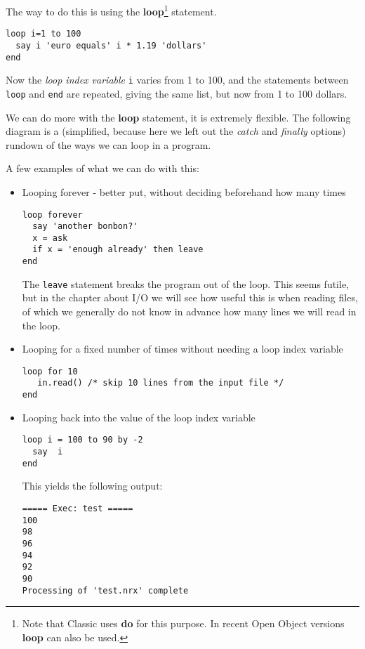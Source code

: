 {The way to do this is using the \textbf{loop}\footnote{Note that
  Classic \Rexx{} uses \textbf{do} for this purpose. In recent Open
  Object \Rexx{} versions
  \textbf{loop} can also be used.} statement.
\begin{lstlisting}[label=withoop,caption=With a loop]
loop i=1 to 100
  say i 'euro equals' i * 1.19 'dollars'
end
\end{lstlisting}
Now the \emph{loop index variable} \texttt{i} varies from 1 to 100,
and the statements between \texttt{loop} and \texttt{end} are
repeated, giving the same list, but now from 1 to 100 dollars.

We can do more with the \textbf{loop} statement, it is extremely
flexible. The following diagram is a (simplified, because here we left
out the \emph{catch} and \emph{finally} options) rundown of the ways
we can loop in a program.


A few examples of what we can do with this: 
\begin{itemize}
\item Looping forever - better put, without deciding beforehand how
  many times
\begin{lstlisting}[label=loopforever,caption=Loop Forever]
loop forever
  say 'another bonbon?'
  x = ask
  if x = 'enough already' then leave
end
\end{lstlisting}
The \texttt{leave} statement breaks the program out of the loop. This
seems futile, but in the chapter about I/O we will see how useful this
is when reading files, of which we generally do not know in advance
how many lines we will read in the loop.

\item Looping for a fixed number of times without needing a loop index
  variable
\begin{lstlisting}[label=loopfixed,caption=Loop for a fixed number of
  times without loop index variable]
loop for 10
   in.read() /* skip 10 lines from the input file */
end
\end{lstlisting}
\item Looping back into the value of the loop index variable
\begin{lstlisting}[label=loopforever,caption=Loop Forever]
loop i = 100 to 90 by -2
  say  i
end
\end{lstlisting}
This yields the following output:
\begin{verbatim}
===== Exec: test =====
100
98
96
94
92
90
Processing of 'test.nrx' complete
\end{verbatim}
\end{itemize}

}
